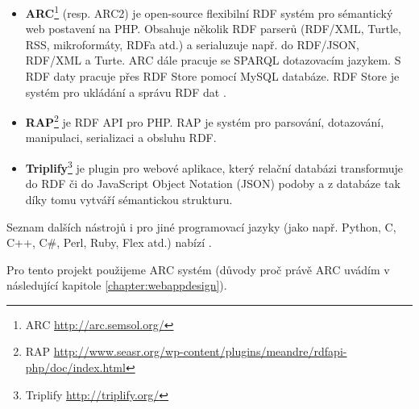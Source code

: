 \begin{itemize}
\item \textbf{ARC}\footnote{ARC \url{http://arc.semsol.org/}} (resp. ARC2) je open-source flexibilní RDF systém pro sémantický web postavení na PHP. Obsahuje několik RDF parserů (RDF/XML, Turtle, RSS, mikroformáty, RDFa atd.) a serialuzuje např. do RDF/JSON, RDF/XML a Turte. ARC dále pracuje se SPARQL dotazovacím jazykem. 
S RDF daty pracuje přes RDF Store pomocí MySQL databáze. 
RDF Store je systém pro ukládání a správu RDF dat \cite{rdfstore}. 

\item \textbf{RAP}\footnote{RAP \url{http://www.seasr.org/wp-content/plugins/meandre/rdfapi-php/doc/index.html}} je RDF API pro PHP. RAP je systém pro parsování, dotazování, manipulaci, serializaci a obsluhu RDF. 

\item \textbf{Triplify}\footnote{Triplify \url{http://triplify.org/}} je plugin pro webové aplikace, který relační databázi transformuje do RDF či do JavaScript Object Notation (JSON) podoby a z databáze tak díky tomu vytváří sémantickou strukturu.
\end{itemize}

Seznam dalších nástrojů i pro jiné programovací jazyky (jako např. Python, C, C++, C\#, Perl, Ruby, Flex atd.) nabízí \cite{semwebtools}.

Pro tento projekt použijeme ARC systém (důvody proč právě ARC uvádím v následující kapitole \ref{chapter:webappdesign}).  